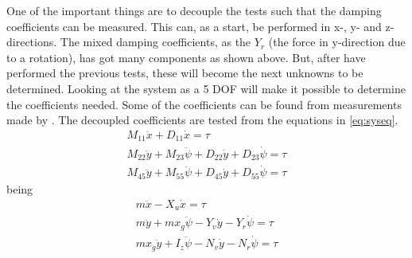 One of the important things are to decouple the tests such that the damping coefficients can be measured. This can, as a start, be performed in x-, y- and z-directions. The mixed damping coefficients, as the $Y_r$ (the force in y-direction due to a rotation), has got many components as shown above. But, after have performed the previous tests, these will become the next unknowns to be determined. Looking at the system as a 5 \ac{DOF} will make it possible to determine the coefficients needed. Some of the coefficients can be found from measurements made by \citep{13gr931}. The decoupled coefficients are tested from the equations in \ref{eq:syseq}.
\begin{subequations}
\begin{align}
M_{11} \ddot x + D_{11} \dot x = \tau\\
M_{22} \ddot y + M_{23} \ddot \psi + D_{22} \dot y + D_{23} \dot \psi = \tau\\
M_{45} \ddot y + M_{55} \ddot \psi + D_{45} \dot y + D_{55} \dot \psi = \tau
\end{align}
\end{subequations}
being
\begin{subequations}
\begin{align}
m \ddot x - X_u \dot x = \tau\\
m \ddot y + mx_g\ddot\psi - Y_v \dot y - Y_r \dot \psi = \tau\\
mx_g \ddot y + I_z\ddot \psi - N_v \dot y - N_r \dot \psi = \tau
\end{align}
\label{eq:syseq}
\end{subequations}

